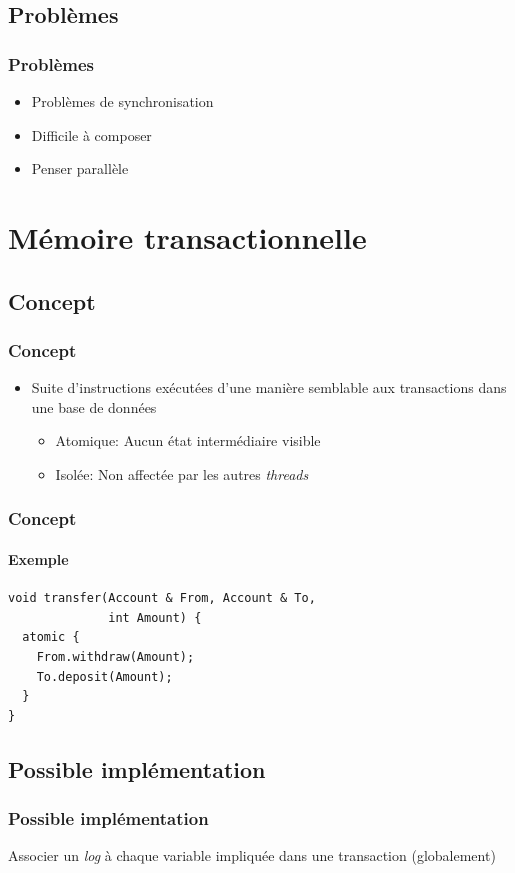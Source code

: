 \documentclass{beamer}
\begin{document}
\subsection{Problèmes}
\begin{frame}
\frametitle{Problèmes}
\begin{itemize}
\item Problèmes de synchronisation
\item<3-> Difficile à composer
\item<4-> Penser parallèle
\end{itemize}
\end{frame}

\section{Mémoire transactionnelle}
\subsection{Concept}
\begin{frame}
\frametitle{Concept}
\begin{itemize}
\item Suite d'instructions exécutées d'une manière semblable aux transactions dans une base de données
\begin{itemize}
\item<2-> Atomique: Aucun état intermédiaire visible
\item<3-> Isolée: Non affectée par les autres \textit{threads}
\end{itemize}
\end{itemize}
\end{frame}

\begin{frame}[fragile]
\frametitle{Concept}
\framesubtitle{Exemple}
\begin{lstlisting}
void transfer(Account & From, Account & To, 
              int Amount) {
  atomic {
    From.withdraw(Amount);
    To.deposit(Amount);
  }
}
\end{lstlisting}
\end{frame}

\subsection{Possible implémentation}
\begin{frame}
\frametitle{Possible implémentation}
\begin{algorithm}[H]
 Associer un \textit{log} à chaque variable impliquée dans une transaction (globalement)\;
\end{algorithm}
\end{frame}
\end{document}
